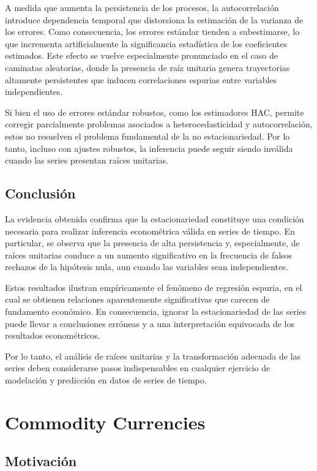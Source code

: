 \documentclass[11pt,a4paper]{article}
\begin{document}
	A medida que aumenta la persistencia de los procesos, la autocorrelación introduce dependencia temporal que distorsiona la estimación de la varianza de los errores. Como consecuencia, los errores estándar tienden a subestimarse, lo que incrementa artificialmente la significancia estadística de los coeficientes estimados. Este efecto se vuelve especialmente pronunciado en el caso de caminatas aleatorias, donde la presencia de raíz unitaria genera trayectorias altamente persistentes que inducen correlaciones espurias entre variables independientes.
	
	Si bien el uso de errores estándar robustos, como los estimadores HAC, permite corregir parcialmente problemas asociados a heterocedasticidad y autocorrelación, estos no resuelven el problema fundamental de la no estacionariedad. Por lo tanto, incluso con ajustes robustos, la inferencia puede seguir siendo inválida cuando las series presentan raíces unitarias.

	
	\subsection{Conclusión}
	
	La evidencia obtenida confirma que la estacionariedad constituye una condición necesaria para realizar inferencia econométrica válida en series de tiempo. En particular, se observa que la presencia de alta persistencia y, especialmente, de raíces unitarias conduce a un aumento significativo en la frecuencia de falsos rechazos de la hipótesis nula, aun cuando las variables sean independientes.
	
	Estos resultados ilustran empíricamente el fenómeno de regresión espuria, en el cual se obtienen relaciones aparentemente significativas que carecen de fundamento económico. En consecuencia, ignorar la estacionariedad de las series puede llevar a conclusiones erróneas y a una interpretación equivocada de los resultados econométricos.
	
	Por lo tanto, el análisis de raíces unitarias y la transformación adecuada de las series deben considerarse pasos indispensables en cualquier ejercicio de modelación y predicción en datos de series de tiempo.

	\newpage
	\section{Commodity Currencies}
	
	\subsection{Motivación}
	
\end{document}
